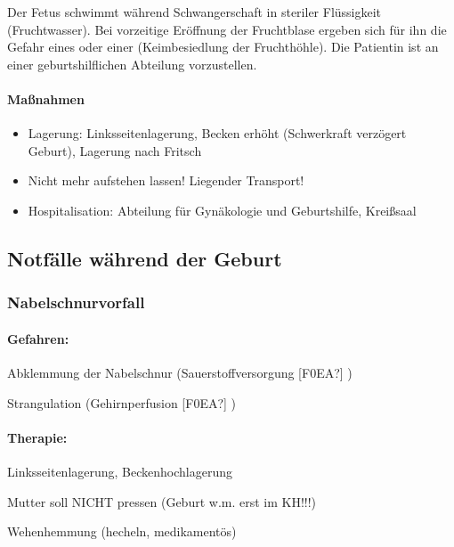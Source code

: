 Der Fetus schwimmt während  Schwangerschaft in steriler
Fl\"ussigkeit (Fruchtwasser). Bei vorzeitige Eröffnung der
Fruchtblase ergeben sich für ihn die Gefahr
eines  oder einer 
(Keimbesiedlung der Fruchthöhle). Die Patientin ist an
einer geburtshilflichen Abteilung vorzustellen.

\begin{gMassnahmenEnv}
    \paragraph{Ma{\ss}nahmen}

\begin{itemize}
\item Lagerung: Linksseitenlagerung, Becken erhöht
(Schwerkraft verzögert Geburt), Lagerung nach Fritsch
\item Nicht mehr aufstehen lassen! Liegender Transport!
\item Hospitalisation: Abteilung für Gynäkologie und
Geburtshilfe, Kreißsaal
\end{itemize}
\end{gMassnahmenEnv}



\subsection{Notfälle während der Geburt}

\subsubsection{Nabelschnurvorfall}

\paragraph{Gefahren:}

Abklemmung der Nabelschnur  (Sauerstoffversorgung  [F0EA?] )

Strangulation (Gehirnperfusion [F0EA?] )

\paragraph{Therapie:}

Linksseitenlagerung, Beckenhochlagerung

Mutter soll NICHT pressen (Geburt w.m. erst  im KH!!!)

Wehenhemmung (hecheln, medikamentös) 

